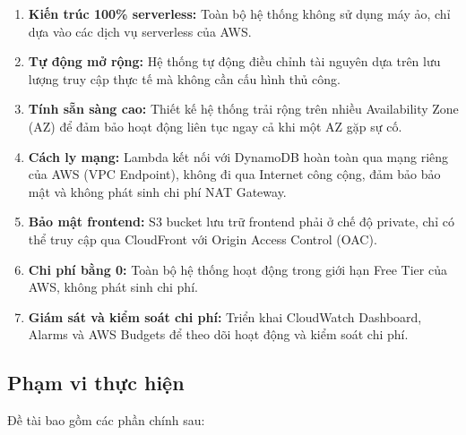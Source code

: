 \begin{enumerate}
    \item \textbf{Kiến trúc 100\% serverless:} Toàn bộ hệ thống không sử dụng máy ảo, chỉ dựa vào các dịch vụ serverless của AWS.
    
    \item \textbf{Tự động mở rộng:} Hệ thống tự động điều chỉnh tài nguyên dựa trên lưu lượng truy cập thực tế mà không cần cấu hình thủ công.
    
    \item \textbf{Tính sẵn sàng cao:} Thiết kế hệ thống trải rộng trên nhiều Availability Zone (AZ) để đảm bảo hoạt động liên tục ngay cả khi một AZ gặp sự cố.
    
    \item \textbf{Cách ly mạng:} Lambda kết nối với DynamoDB hoàn toàn qua mạng riêng của AWS (VPC Endpoint), không đi qua Internet công cộng, đảm bảo bảo mật và không phát sinh chi phí NAT Gateway.
    
    \item \textbf{Bảo mật frontend:} S3 bucket lưu trữ frontend phải ở chế độ private, chỉ có thể truy cập qua CloudFront với Origin Access Control (OAC).
    
    \item \textbf{Chi phí bằng 0:} Toàn bộ hệ thống hoạt động trong giới hạn Free Tier của AWS, không phát sinh chi phí.
    
    \item \textbf{Giám sát và kiểm soát chi phí:} Triển khai CloudWatch Dashboard, Alarms và AWS Budgets để theo dõi hoạt động và kiểm soát chi phí.
\end{enumerate}

\subsection{Phạm vi thực hiện}
\label{ssec:scope}

Đề tài bao gồm các phần chính sau:

